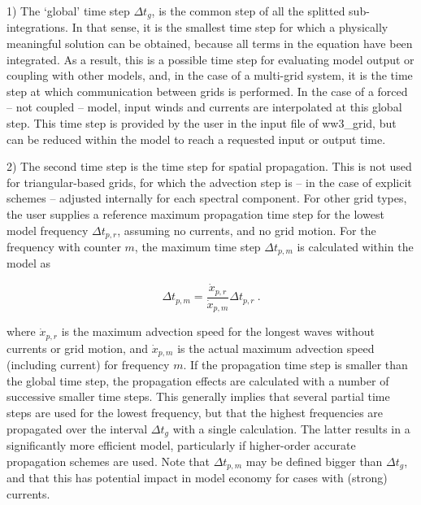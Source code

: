 \begin{list}{xx}{\itemsep 0mm \parsep 0mm \rightmargin 5mm}

\item[1)] The `global' time step $\Delta t_g$, is the common step of all the splitted sub-integrations. In that sense, 
it is the smallest time step for which a physically meaningful solution can be obtained, because all terms in the equation have been 
integrated. As a result, this is a possible time step for evaluating model output or coupling with other models, 
and, in the case of a multi-grid system,  it is the time step at which communication 
between grids is performed. In the case of a forced -- not coupled -- model, input winds and currents are
interpolated at this global step. This time step is provided by the user in the input file of {\code ww3\_grid}, but can be reduced
within the model to reach a requested input or output time.

\item[2)] The second time step is the time step for spatial propagation. This is not used for triangular-based 
grids, for which the advection step is -- in the case of explicit schemes -- adjusted internally for each spectral component. For other grid types, the
user supplies a reference maximum propagation time step for the lowest model
frequency $\Delta t_{p,r}$, assuming no currents, and no grid motion. For the
frequency with counter $m$, the maximum time step $\Delta t_{p,m}$ is
calculated within the model as


\begin{equation}
\Delta t_{p,m} = \frac{{\dot{x}}_{p,r}}{{\dot{x}}_{p,m}} \Delta t_{p,r}
\: . \label{eq:dtpl} \end{equation}

\noindent
where $\dot{x}_{p,r}$ is the maximum advection speed for the longest waves
without currents or grid motion, and $\dot{x}_{p,m}$ is the actual maximum
advection speed (including current) for frequency $m$. If the propagation time
step is smaller than the global time step, the propagation effects are
calculated with a number of successive smaller time steps. This generally
implies that several partial time steps are used for the lowest frequency, but
that the highest frequencies are propagated over the interval $\Delta t_g$
with a single calculation. The latter results in a significantly more
efficient model, particularly if higher-order accurate propagation schemes are
used. Note that $\Delta t_{p,m}$ may be defined bigger than $\Delta t_g$, and
that this has potential impact in model economy for cases with (strong)
currents.


\end{list}
